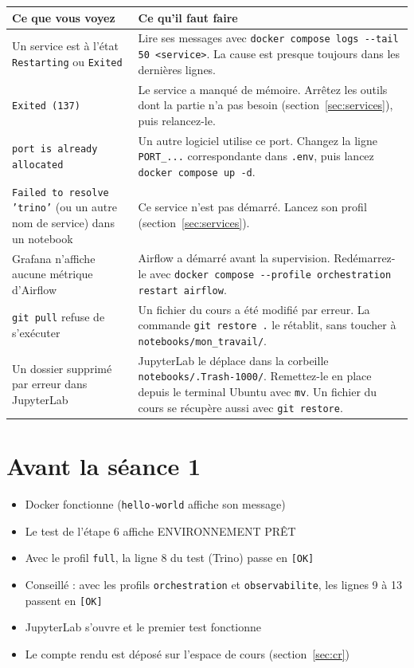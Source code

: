 \documentclass[11pt,a4paper]{article}
\newcommand{\cmd}[1]{\texttt{#1}}
\newcommand{\cocher}{$\square$\ }
\begin{document}
\begin{center}
\small
\renewcommand{\arraystretch}{1.3}
\begin{tabularx}{\textwidth}{@{}>{\raggedright\arraybackslash}p{5.2cm} X@{}}
\toprule
\textbf{Ce que vous voyez} & \textbf{Ce qu'il faut faire} \\
\midrule
Un service est à l'état \texttt{Restarting} ou \texttt{Exited} &
  Lire ses messages avec \cmd{docker compose logs -{}-tail 50 <service>}. La cause est presque
  toujours dans les dernières lignes. \\
\texttt{Exited (137)} &
  Le service a manqué de mémoire. Arrêtez les outils dont la partie n'a pas besoin
  (section~\ref{sec:services}), puis relancez-le. \\
\texttt{port is already allocated} &
  Un autre logiciel utilise ce port. Changez la ligne \cmd{PORT\_...} correspondante dans
  \cmd{.env}, puis lancez \cmd{docker compose up -d}. \\
\texttt{Failed to resolve 'trino'} (ou un autre nom de service) dans un notebook &
  Ce service n'est pas démarré. Lancez son profil (section~\ref{sec:services}). \\
Grafana n'affiche aucune métrique d'Airflow &
  Airflow a démarré avant la supervision. Redémarrez-le avec \cmd{docker compose -{}-profile orchestration restart airflow}. \\
\texttt{git pull} refuse de s'exécuter &
  Un fichier du cours a été modifié par erreur. La commande \cmd{git restore .} le rétablit, sans toucher à
  \cmd{notebooks/mon\_travail/}. \\
Un dossier supprimé par erreur dans JupyterLab &
  JupyterLab le déplace dans la corbeille \cmd{notebooks/.Trash-1000/}. Remettez-le en place
  depuis le terminal Ubuntu avec \cmd{mv}. Un fichier du cours se récupère aussi avec
  \cmd{git restore}. \\
\bottomrule
\end{tabularx}
\end{center}

\section{Avant la séance 1}

\begin{itemize}[leftmargin=*,label=\cocher,itemsep=2pt]
\item Docker fonctionne (\cmd{hello-world} affiche son message)
\item Le test de l'étape 6 affiche \og ENVIRONNEMENT PRÊT \fg{}
\item Avec le profil \cmd{full}, la ligne 8 du test (Trino) passe en \texttt{[OK]}
\item Conseillé : avec les profils \cmd{orchestration} et \cmd{observabilite}, les lignes 9 à 13 passent en \texttt{[OK]}
\item JupyterLab s'ouvre et le premier test fonctionne
\item Le compte rendu est déposé sur l'espace de cours (section~\ref{sec:cr})
\end{itemize}
\end{document}
